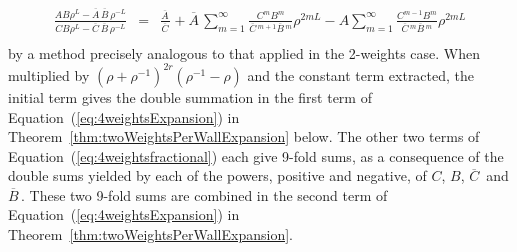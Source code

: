 \documentclass[11pt,a4paper]{article}
\newcommand{\p}{\rho}
\newcommand{\Ao}{\overline{A}\,}
\newcommand{\Bo}{\overline{B}\,}
\newcommand{\Co}{\overline{C}\,}
\begin{document}
\begin{align}
\frac{AB\p^L-\Ao \Bo \p^{-L}}{C B \p^L - \Co \Bo \p^{-L}}
&=& \frac{\Ao}{\Co} +
\Ao \sum_{m=1}^\infty \frac{C^m B^m}{\Co^{m+1} \Bo^m}\p^{2mL} 
-
A \sum_{m=1}^\infty \frac{C^{m-1} B^{m}}{\Co^{m} \Bo^{m}} \p^{2mL} \nonumber \label{eq:4weightsfractional}\\
\end{align}
by a method precisely analogous to that applied in the 2-weights case.  When multiplied by $(\p+\p^{-1})^{2r}(\p^{-1}-\p)$ and the constant term extracted, the initial term gives the double summation in the first term of Equation~(\ref{eq:4weightsExpansion}) in Theorem~\ref{thm:twoWeightsPerWallExpansion} below.  The other two terms of Equation~(\ref{eq:4weightsfractional}) each give 9-fold sums, as a consequence of the double sums yielded by each of the powers, positive and negative, of $C$, $B$, $\Co$ and $\Bo$.  These two 9-fold sums are combined in the second term of Equation~(\ref{eq:4weightsExpansion}) in Theorem~\ref{thm:twoWeightsPerWallExpansion}.
%
\end{document}

